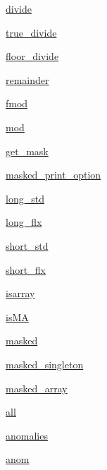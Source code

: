 \begin{DoxyCompactItemize}
\hyperlink{namespacenumpy_1_1ma_1_1core_a29bf5b3bb49649e6c084120be48dc302}{divide}
\item 
\hyperlink{namespacenumpy_1_1ma_1_1core_a1212505d2325c633277326ea6ff0ceb1}{true\+\_\+divide}
\item 
\hyperlink{namespacenumpy_1_1ma_1_1core_aab4ab1ae0c9d8f94ed7b688e8419ccfd}{floor\+\_\+divide}
\item 
\hyperlink{namespacenumpy_1_1ma_1_1core_af9ec8885ec7e33164ab240325c62cb91}{remainder}
\item 
\hyperlink{namespacenumpy_1_1ma_1_1core_aa399d2d1f4e648e9ce4930b1212b3498}{fmod}
\item 
\hyperlink{namespacenumpy_1_1ma_1_1core_a35d11841e3187865b34bdc56062e28f8}{mod}
\item 
\hyperlink{namespacenumpy_1_1ma_1_1core_a089c465f38e219e618241a2bd6706a72}{get\+\_\+mask}
\item 
\hyperlink{namespacenumpy_1_1ma_1_1core_a42b4fb5861601e58f9e118e6630187b2}{masked\+\_\+print\+\_\+option}
\item 
\hyperlink{namespacenumpy_1_1ma_1_1core_a7a792f57b00c1a1d23cb6ae9836dc604}{long\+\_\+std}
\item 
\hyperlink{namespacenumpy_1_1ma_1_1core_a4a1485f95578817403f56d04aea0fc2e}{long\+\_\+flx}
\item 
\hyperlink{namespacenumpy_1_1ma_1_1core_a2b309774715692ad5999a0acbc018b93}{short\+\_\+std}
\item 
\hyperlink{namespacenumpy_1_1ma_1_1core_aab53942548374c8c0107236110801d5b}{short\+\_\+flx}
\item 
\hyperlink{namespacenumpy_1_1ma_1_1core_a350a49b5091ca75bba5576eca2a22404}{isarray}
\item 
\hyperlink{namespacenumpy_1_1ma_1_1core_a51934f356f9682f4347d725747b4bfef}{is\+MA}
\item 
\hyperlink{namespacenumpy_1_1ma_1_1core_ad49455d80ed35dc668673068a0fd6129}{masked}
\item 
\hyperlink{namespacenumpy_1_1ma_1_1core_abb5bc3f0baa155687c1538e4d300f0c3}{masked\+\_\+singleton}
\item 
\hyperlink{namespacenumpy_1_1ma_1_1core_a0462968b90d3e1a2aa6c54845c45f5da}{masked\+\_\+array}
\item 
\hyperlink{namespacenumpy_1_1ma_1_1core_a45b43786ae893dd0a3a7e113ccb00ee9}{all}
\item 
\hyperlink{namespacenumpy_1_1ma_1_1core_ae502a3b30272ef3afe2f3514f5ff2805}{anomalies}
\item 
\hyperlink{namespacenumpy_1_1ma_1_1core_ade2cbd2bc7d0e5fc44ebf43552a8b720}{anom}

\end{DoxyCompactItemize}
